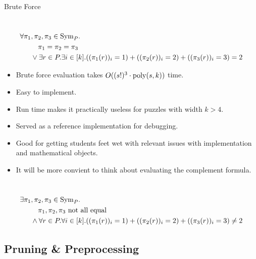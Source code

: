 \documentclass[t,10pt,
mathserif,xcolor=dvipsnames]{beamer}
\begin{document}
\begin{myframe}{Brute Force}

  ~\\[-7ex]
  \begin{equation*}
    \begin{aligned}
      \forall \pi_1&,\pi_2, \pi_3 \in \mathrm{Sym}_{P}.\\
      &~~~\pi_1 = \pi_2 = \pi_3\\
      &\vee \exists r \in P. \exists i \in [k]. ((\pi_1(r))_i = 1) + ((\pi_2(r))_i = 2) + ((\pi_3(r))_i = 3) = 2
    \end{aligned}
  \end{equation*}
  
  \begin{itemize}
  \item Brute force evaluation takes $O((s!)^3\cdot\mathrm{poly}(s,k))$ time.
  \item Easy to implement.
  \item Run time makes it practically useless for puzzles with width $k > 4$.
  \item Served as a reference implementation for debugging.
  \item Good for getting students feet wet with relevant issues with
    implementation and mathematical objects.
  \item It will be more convient to think about evaluating the complement formula.
  \end{itemize}

  ~\\[-5ex]
  \begin{equation*}
    \begin{aligned}
      \exists \pi_1&,\pi_2, \pi_3 \in \mathrm{Sym}_{P}.\\
      &~~~\pi_1, \pi_2, \pi_3 \text{ not all equal}\\
      &\wedge \forall r \in P. \forall i \in [k]. ((\pi_1(r))_i = 1) + ((\pi_2(r))_i = 2) + ((\pi_3(r))_i = 3) \neq 2
    \end{aligned}
  \end{equation*}
  
\end{myframe}

\subsection{Pruning \& Preprocessing}
\end{document}
